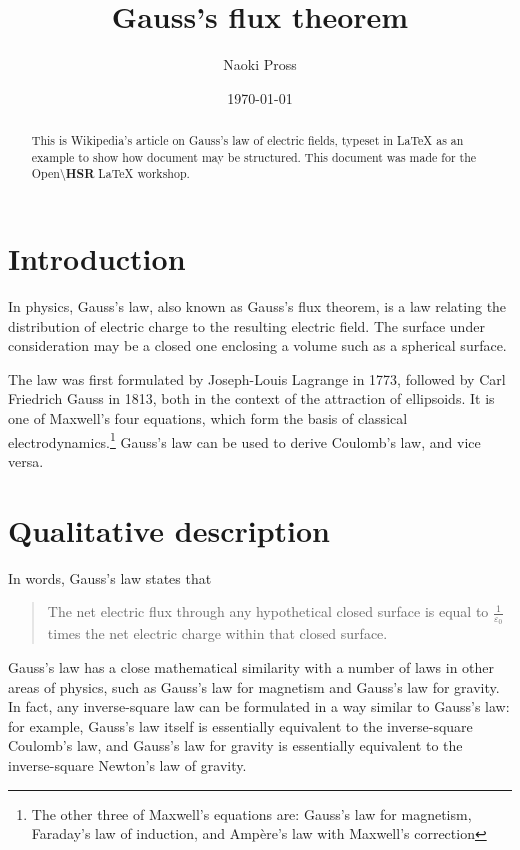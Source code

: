 \documentclass[a4paper, 12pt]{article}
\title{Gauss's flux theorem}
\author{Naoki Pross}
\date{\today}
\begin{document}
\maketitle

\begin{abstract}
This is Wikipedia's article on Gauss's law \cite{wiki} of electric fields, typeset in \LaTeX{} as an example to show how document may be structured. This document was made for the \textsf{Open\textcolor{cyan!50!blue}{\textbackslash{\textbf{HSR}}}} \LaTeX{} workshop.
\end{abstract}
\tableofcontents
\newpage

\section{Introduction}
In physics, Gauss's law, also known as Gauss's flux theorem, is a law relating the distribution of electric charge to the resulting electric field. The surface under consideration may be a closed one enclosing a volume such as a spherical surface.

The law was first formulated by Joseph-Louis Lagrange in 1773, followed by Carl Friedrich Gauss in 1813, both in the context of the attraction of ellipsoids. It is one of Maxwell's four equations, which form the basis of classical electrodynamics.\footnote{The other three of Maxwell's equations are: Gauss's law for magnetism, Faraday's law of induction, and Ampère's law with Maxwell's correction} Gauss's law can be used to derive Coulomb's law, and vice versa. 

\section{Qualitative description}
In words, Gauss's law states that

\begin{quote}
The net electric flux through any hypothetical closed surface is equal to \(\frac{1}{\varepsilon_0}\) times the net electric charge within that closed surface.
\end{quote}

Gauss's law has a close mathematical similarity with a number of laws in other areas of physics, such as Gauss's law for magnetism and Gauss's law for gravity. In fact, any inverse-square law can be formulated in a way similar to Gauss's law: for example, Gauss's law itself is essentially equivalent to the inverse-square Coulomb's law, and Gauss's law for gravity is essentially equivalent to the inverse-square Newton's law of gravity.
\end{document}
